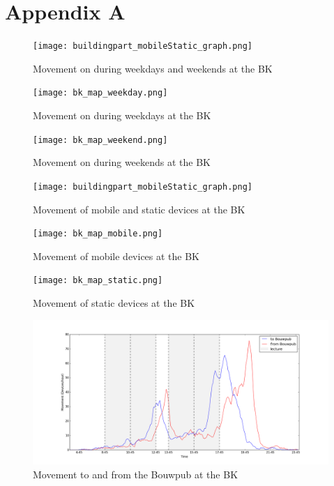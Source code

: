 \chapter{Appendix A}\label{appendix:appendixA}

\begin{figure}[H]
\centering
\texttt{[image: buildingpart\_mobileStatic\_graph.png]}
\captionsetup{justification=centering}
\caption{Movement on during weekdays and weekends at the BK}
\label{figure:bk_weekdayWeekend}
\end{figure}

\begin{figure}[H]
\centering
\texttt{[image: bk\_map\_weekday.png]}
\captionsetup{justification=centering}
\caption{Movement on during weekdays at the BK}
\label{map:bk_weekday}
\end{figure}

\begin{figure}[H]
\centering
\texttt{[image: bk\_map\_weekend.png]}
\captionsetup{justification=centering}
\caption{Movement on during weekends at the BK}
\label{map:bk_weekend}
\end{figure}

\begin{figure}[H]
\centering
\texttt{[image: buildingpart\_mobileStatic\_graph.png]}
\captionsetup{justification=centering}
\caption{Movement of mobile and static devices at the BK}
\label{figure:bk_MobileStatic}
\end{figure}

\begin{figure}[H]
\centering
\texttt{[image: bk\_map\_mobile.png]}
\captionsetup{justification=centering}
\caption{Movement of mobile devices at the BK}
\label{map:bk_mobile}
\end{figure}

\begin{figure}[H]
\centering
\texttt{[image: bk\_map\_static.png]}
\captionsetup{justification=centering}
\caption{Movement of static devices at the BK}
\label{map:bk_static}
\end{figure}

\begin{figure}[H]
\centering
\includegraphics[scale=0.35]{buildingpart_fromTo_bouwpubGraph.png}
\captionsetup{justification=centering}
\caption{Movement to and from the Bouwpub at the BK}
\label{figure:bk_Bouwpub}
\end{figure}


